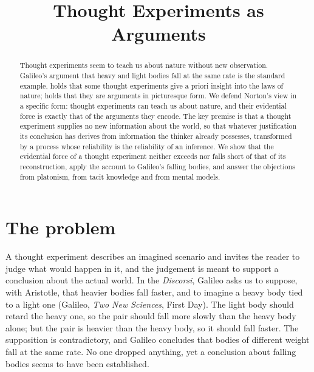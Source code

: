 \documentclass{situationist-preprint}
\title{Thought Experiments as Arguments}
\begin{document}
\maketitle

\begin{abstract}
Thought experiments seem to teach us about nature without new observation. Galileo's argument that heavy and light bodies fall at the same rate is the standard example. \citet{Brown1991} holds that some thought experiments give a priori insight into the laws of nature; \citet{Norton1996,Norton2004} holds that they are arguments in picturesque form. We defend Norton's view in a specific form: thought experiments can teach us about nature, and their evidential force is exactly that of the arguments they encode. The key premise is that a thought experiment supplies no new information about the world, so that whatever justification its conclusion has derives from information the thinker already possesses, transformed by a process whose reliability is the reliability of an inference. We show that the evidential force of a thought experiment neither exceeds nor falls short of that of its reconstruction, apply the account to Galileo's falling bodies, and answer the objections from platonism, from tacit knowledge and from mental models.
\end{abstract}

\section{The problem}

A thought experiment describes an imagined scenario and invites the reader to judge what would happen in it, and the judgement is meant to support a conclusion about the actual world. In the \emph{Discorsi}, Galileo asks us to suppose, with Aristotle, that heavier bodies fall faster, and to imagine a heavy body tied to a light one (Galileo, \emph{Two New Sciences}, First Day). The light body should retard the heavy one, so the pair should fall more slowly than the heavy body alone; but the pair is heavier than the heavy body, so it should fall faster. The supposition is contradictory, and Galileo concludes that bodies of different weight fall at the same rate. No one dropped anything, yet a conclusion about falling bodies seems to have been established.
\end{document}

